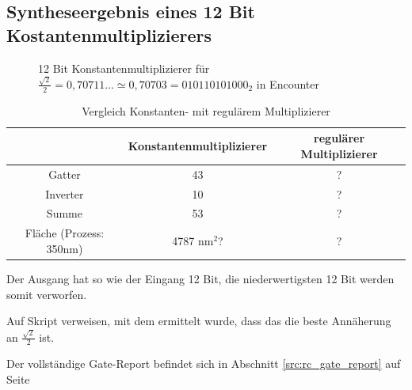 \subsection{Syntheseergebnis eines 12 Bit Kostantenmultiplizierers}
\begin{figure}[!ht]
\centering  
  \caption{12 Bit Konstantenmultiplizierer für $\frac{\sqrt{2}}{2} = 0,70711... \simeq 0,70703 = 010110101000_2$ in Encounter}
\end{figure}



\begin{table}[!ht]
 \caption{Vergleich Konstanten- mit regulärem Multiplizierer}
 \label{tab:VergleichMultiplizierer}
 \begin{tabular}{c|c|c}
		& Konstantenmultiplizierer 	& regulärer Multiplizierer\\
  \hline	
  Gatter			& 43				& ? \\
  Inverter			& 10				& ? \\
  Summe				& 53				& ? \\
  Fläche (Prozess: 350nm)	& 4787 nm$^2$?			& ? 
 \end{tabular}
\end{table}


Der Ausgang hat so wie der Eingang 12 Bit, die niederwertigsten 12 Bit werden somit verworfen.

Auf Skript verweisen, mit dem ermittelt wurde, dass das die beste Annäherung an $\frac{\sqrt{2}}{2}$ ist.

Der vollständige Gate-Report befindet sich in Abschnitt \ref{src:rc_gate_report} auf Seite \pageref{src:rc_gate_report}



